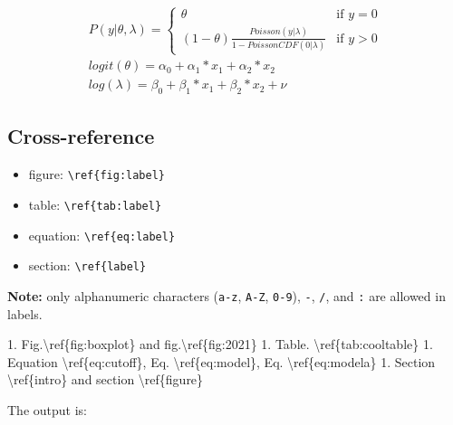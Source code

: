 \documentclass[review]{elsarticle} %
\providecommand{\tightlist}{%
  \setlength{\itemsep}{0pt}\setlength{\parskip}{0pt}}
\newenvironment{Shaded}{\begin{snugshade}}{\end{snugshade}}
\newcommand{\FloatTok}[1]{\textcolor[rgb]{0.00,0.00,0.81}{#1}}
\newcommand{\NormalTok}[1]{#1}
\begin{document}
\begin{subequations}
  \label{eq:model}
  \begin{align}
  \label{eq:modela}
P(y|\theta, \lambda) = 
\left\{
    \begin{array}{lr}
          \theta & \text{if } y = 0\\
          (1 - \theta) \frac{Poisson(y|\lambda)}{1 - PoissonCDF(0|\lambda)} 
          & \text{if } y > 0
    \end{array}
\right. \\
  \label{eq:modelb}
logit(\theta) = \alpha_0 + \alpha_1 * x_1 + \alpha_2 * x_2 \\
  \label{eq:modelc}
log(\lambda) = \beta_0 + \beta_1 * x_1 + \beta_2 * x_2 + \nu
  \end{align}
\end{subequations}

\subsection{Cross-reference}\label{cross-reference}

\begin{itemize}
\tightlist
\item
  figure: \texttt{\textbackslash{}ref\{fig:label\}}
\item
  table: \texttt{\textbackslash{}ref\{tab:label\}}
\item
  equation: \texttt{\textbackslash{}ref\{eq:label\}}
\item
  section: \texttt{\textbackslash{}ref\{label\}}
\end{itemize}

\textbf{Note:} only alphanumeric characters (\texttt{a-z}, \texttt{A-Z},
\texttt{0-9}), \texttt{-}, \texttt{/}, and \texttt{:} are allowed in
labels.

\begin{Shaded}
\begin{Highlighting}[]
\NormalTok{1. }\FloatTok{Fig.\textbackslash{}ref\{fig:boxplot\} and fig.\textbackslash{}ref\{fig:2021\}}
\FloatTok{1. Table. \textbackslash{}ref\{tab:cooltable\}}
\FloatTok{1. Equation \textbackslash{}ref\{eq:cutoff\}, Eq. \textbackslash{}ref\{eq:model\}, Eq. \textbackslash{}ref\{eq:modela\}}
\FloatTok{1. Section \textbackslash{}ref\{intro\} and section \textbackslash{}ref\{figure\}}
\end{Highlighting}
\end{Shaded}

The output is:
\end{document}
